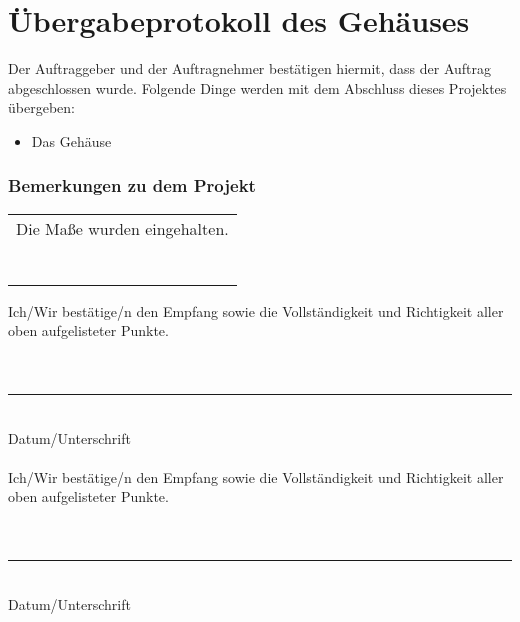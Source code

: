 \section[Übergabeprotokoll, Teilauftrag Gehäuse]{Übergabeprotokoll des Gehäuses}
\bigskip
Der Auftraggeber und der Auftragnehmer bestätigen hiermit, dass der Auftrag abgeschlossen wurde. Folgende Dinge werden mit dem Abschluss dieses Projektes übergeben:
\begin{itemize}
\item Das Gehäuse
\end{itemize}
\bigskip
\subsubsection*{Bemerkungen zu dem Projekt}

\begin{tabular}{|p{\textwidth}|}
\hline
Die Maße wurden eingehalten.\\
\bigskip \\
\bigskip \\
~\\
\hline
\end{tabular}

\bigskip
\bigskip
Ich/Wir bestätige/n den Empfang sowie die Vollständigkeit und Richtigkeit aller oben aufgelisteter Punkte.\\
\bigskip \\
\bigskip \\
\rule{5cm}{0.5mm}\\
Datum/Unterschrift\\
\bigskip \\
Ich/Wir bestätige/n den Empfang sowie die Vollständigkeit und Richtigkeit aller oben aufgelisteter Punkte.\\
\bigskip \\
\bigskip \\
\rule{5cm}{0.5mm}~\\
Datum/Unterschrift
